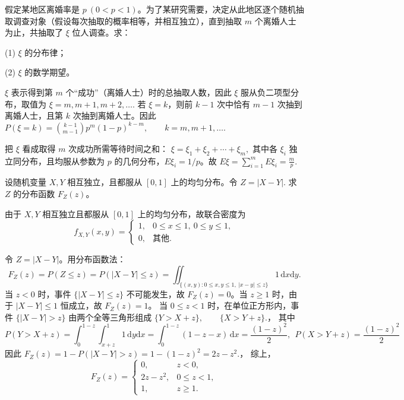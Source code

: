 \documentclass[lang=cn,11pt]{elegantbook}
\begin{document}
\begin{exercise}\label{exer:src-2010-a-05}
假定某地区离婚率是 \(p\ (0<p<1)\)。为了某研究需要，决定从此地区逐个随机抽取调查对象（假设每次抽取的概率相等，并相互独立），直到抽取 \(m\) 个离婚人士为止，共抽取了 \(\xi\) 位人调查。求：\par
(1) \(\xi\) 的分布律；\par
(2) \(\xi\) 的数学期望。
\end{exercise}
\begin{solution}
\(\xi\) 表示得到第 \(m\) 个“成功”（离婚人士）时的总抽取人数，因此 \(\xi\) 服从负二项型分布，取值为
\(
\xi=m,m+1,m+2,\dots.
\)
若 \(\xi=k\)，则前 \(k-1\) 次中恰有 \(m-1\) 次抽到离婚人士，且第 \(k\) 次抽到离婚人士。因此
\(
P(\xi=k)=\binom{k-1}{m-1}p^m(1-p)^{k-m},
\qquad k=m,m+1,\dots.
\)

把 \(\xi\) 看成取得 \(m\) 次成功所需等待时间之和：
\(
\xi=\xi_1+\xi_2+\cdots+\xi_m,
\)
其中各 \(\xi_i\) 独立同分布，且均服从参数为 \(p\) 的几何分布，\(E\xi_i=1/p\)。故
\(
E\xi=\sum_{i=1}^m E\xi_i=\frac mp.
\)
\end{solution}


\begin{exercise}\label{exer:src-2008-01-3c-iii-02}\label{exer:src-paper4-iii-02}
设随机变量 \(X,Y\) 相互独立，且都服从 \([0,1]\) 上的均匀分布。令
\(
Z=|X-Y|.
\)
求 \(Z\) 的分布函数 \(F_Z(z)\)。
\end{exercise}
\begin{solution}
由于 \(X,Y\) 相互独立且都服从 \([0,1]\) 上的均匀分布，故联合密度为
\[
f_{X,Y}(x,y)=
\begin{cases}
1, & 0\le x\le1,\ 0\le y\le1,\\
0, & \text{其他}.
\end{cases}
\]

令 \(Z=|X-Y|\)。用分布函数法：
\[
F_Z(z)=P(Z\le z)=P(|X-Y|\le z)
=\iint_{\{(x,y):0\le x,y\le1,\ |x-y|\le z\}}1\,\mathrm dx\mathrm dy.
\]
当 \(z<0\) 时，事件 \(\{|X-Y|\le z\}\) 不可能发生，故 \(F_Z(z)=0\)。当 \(z\ge1\) 时，由于 \(|X-Y|\le1\) 恒成立，故 \(F_Z(z)=1\)。
当 \(0\le z<1\) 时，在单位正方形内，事件 \(\{|X-Y|>z\}\) 由两个全等三角形组成
\(
\{Y>X+z\},\qquad \{X>Y+z\}.
\)，
其中
\[
P(Y>X+z)=\int_0^{1-z}\int_{x+z}^{1}1\,\mathrm dy\mathrm dx
=\int_0^{1-z}(1-z-x)\,\mathrm dx
=\frac{(1-z)^2}{2},~~P(X>Y+z)=\dfrac{(1-z)^2}{2}
\]
因此
\(
F_Z(z)=1-P(|X-Y|>z)
=1-(1-z)^2
=2z-z^2.
\)，
综上，
\[
F_Z(z)=
\begin{cases}
0, & z<0,\\
2z-z^2, & 0\le z<1,\\
1, & z\ge1.
\end{cases}
\]
\end{solution}
\end{document}
